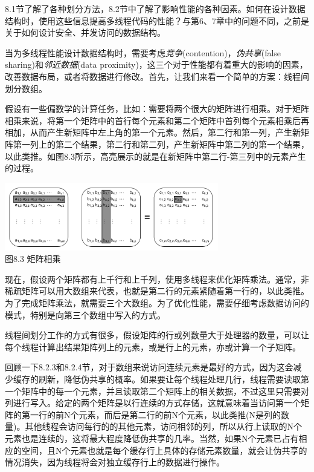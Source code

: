 
8.1节了解了各种划分方法，8.2节中了解了影响性能的各种因素。如何在设计数据结构时，使用这些信息提高多线程代码的性能？与第6、7章中的问题不同，之前是关于如何设计安全、并发访问的数据结构。

当为多线程性能设计数据结构时，需要考虑\textit{竞争}(contention)，\textit{伪共享}(false sharing)和\textit{邻近数据}(data proximity)，这三个对于性能都有着重大的影响的因素，改善数据布局，或者将数据进行修改。首先，让我们来看一个简单的方案：线程间划分数组。


假设有一些偏数学的计算任务，比如：需要将两个很大的矩阵进行相乘。对于矩阵相乘来说，将第一个矩阵中的首行每个元素和第二个矩阵中首列每个元素相乘后再相加，从而产生新矩阵中左上角的第一个元素。然后，第二行和第一列，产生新矩阵第一列上的第二个结果，第二行和第二列，产生新矩阵中第二列的第一个结果，以此类推。如图8.3所示，高亮展示的就是在新矩阵中第二行-第三列中的元素产生的过程。

\begin{center}
  \includegraphics[width=0.7\textwidth]{content/chapter08/images/8-3.png}\\
  图8.3 矩阵相乘
\end{center}

现在，假设两个矩阵都有上千行和上千列，使用多线程来优化矩阵乘法。通常，非稀疏矩阵可以用大数组来代表，也就是第二行的元素紧随着第一行的，以此类推。为了完成矩阵乘法，就需要三个大数组。为了优化性能，需要仔细考虑数据访问的模式，特别是向第三个数组中写入的方式。

线程间划分工作的方式有很多，假设矩阵的行或列数量大于处理器的数量，可以让每个线程计算出结果矩阵列上的元素，或是行上的元素，亦或计算一个子矩阵。

回顾一下8.2.3和8.2.4节，对于数组来说访问连续元素是最好的方式，因为这会减少缓存的刷新，降低伪共享的概率。如果要让每个线程处理几行，线程需要读取第一个矩阵中的每一个元素，并且读取第二个矩阵上的相关数据，不过这里只需要对列进行写入。给定的两个矩阵是以行连续的方式存储，这就意味着当访问第一个矩阵的第一行的前N个元素，而后是第二行的前N个元素，以此类推(N是列的数量)。其他线程会访问每行的的其他元素，访问相邻的列，所以从行上读取的N个元素也是连续的，这将最大程度降低伪共享的几率。当然，如果N个元素已占有相应的空间，且N个元素也就是每个缓存行上具体的存储元素数量，就会让伪共享的情况消失，因为线程将会对独立缓存行上的数据进行操作。

